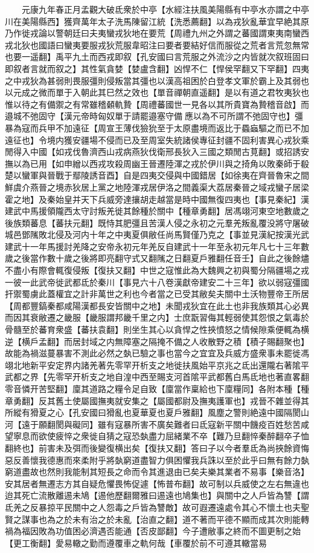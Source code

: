 　　元康九年春正月孟觀大破氐衆於中亭【水經注扶風美陽縣有中亭水亦謂之中亭川在美陽縣西】獲齊萬年太子洗馬陳留江統【洗悉薦翻】以為戎狄亂華宜早絶其原乃作徙戎論以警朝廷曰夫夷蠻戎狄地在要荒【周禮九州之外謂之蕃國謂東夷南蠻西戎北狄也國語曰蠻夷要服戎狄荒服韋昭注曰要者要結好信而服從之荒者言荒忽無常也要一遥翻】禹平九土而西戎即叙【孔安國曰言荒服之外流沙之内皆就次叙班固曰即叙者言就而叙之】其性氣貪婪【婪盧含翻】凶悍不仁【悍侯罕翻又下罕翻】四夷之中戎狄為甚弱則畏服彊則侵叛當其彊也以漢高祖困於白登孝文軍於霸上及其弱也以元成之微而單于入朝此其巳然之效也【單音禪朝直遥翻】是以有道之君牧夷狄也惟以待之有備禦之有常雖稽顙軌贄【周禮蕃國世一見各以其所貴寶為贄稽音啟】而邉城不弛固守【漢元帝時匈奴單于請罷邉塞守備應以為不可所謂不弛固守也】彊暴為寇而兵甲不加遠征【周宣王薄伐獫狁至于太原盡境而返比于蟁蝱驅之而已不加遠征也】令境内獲安疆場不侵而已及至周室失統諸侯專征封疆不固利害異心戎狄乘閒得入中國【如戎伐魯濟西山戎病燕狄伐衛邢長狄入三國之類閒古莧翻】或招誘安撫以為已用【如申繒以西戎攻殺周幽王晉遷陸渾之戎於伊川與之掎角以敗秦師于殽楚以蠻軍與晉戰于鄢陵誘音酉】自是四夷交侵與中國錯居【如徐夷在齊晉魯宋之間鮮虞介燕晉之境赤狄居上黨之地陸渾戎居伊洛之間義渠大荔居秦晉之域戎蠻子居梁霍之地】及秦始皇并天下兵威旁達攘胡走越當是時中國無復四夷也【事見秦紀】漢建武中馬援領隴西太守討叛羌徙其餘種於關中【種章勇翻】居馮翊河東空地數歲之後族類蕃息【蕃扶元翻】既恃其肥彊且苦漢人侵之永初之元羣羌叛亂覆没將守屠破城邑鄧隲敗北侵及河内十年之中夷夏俱敝任尚馬賢僅乃克之【事並見漢紀按漢光武建武十一年馬援討羌降之安帝永初元年羌反自建武十一年至永初元年凡七十三年數歲之後當作數十歲之後將即亮翻守式又翻隲之日翻夏戶雅翻任音壬】自此之後餘燼不盡小有際會輒復侵叛【復扶又翻】中世之寇惟此為大魏興之初與蜀分隔疆場之戎一彼一此武帝徙武都氐於秦川【事見六十八卷漢獻帝建安二十三年】欲以弱寇彊國扞禦蜀虜此蓋權宜之計非萬世之利也今者當之已受其敝矣夫關中土沃物豐帝王所居【周都豐鎬秦都咸陽漢都長安皆關中之地】未聞戎狄宜在此土也非我族類其心必異而因其衰敝遷之畿服【畿服謂邦畿千里之内】士庶翫習侮其輕弱使其怨恨之氣毒於骨髓至於蕃育衆盛【蕃扶袁翻】則坐生其心以貪悍之性挾憤怒之情候隙乘便輒為横逆【横戶孟翻】而居封域之内無障塞之隔掩不備之人收散野之積【積子賜翻聚也】故能為禍滋蔓暴害不測此必然之埶已驗之事也當今之宜宜及兵威方盛衆事未罷徙馮翊北地新平安定界内諸羌著先零罕开析支之地徙扶風始平京兆之氐出還隴右著隂平武都之界【先零罕开析支之地自湟中西至賜支河首隂平武都舊白馬氐地也著直畧翻零音憐开苦堅翻】廩其道路之糧令足自致【廩當作稟給也下廩糧同】各附本種【種章勇翻】反其舊土使屬國撫夷就安集之【屬國都尉及撫夷護軍也】戎晉不雜並得其所縱有猾夏之心【孔安國曰猾亂也夏華夏也夏戶雅翻】風塵之警則絶遠中國隔閡山河【遠于願翻閡與礙同】雖有寇暴所害不廣矣難者曰氐寇新平關中饑疫百姓愁苦咸望寧息而欲使疲悴之衆徙自猜之寇恐埶盡力屈緒業不卒【難乃旦翻悴秦醉翻卒子恤翻終也】前害未及弭而後變復横出矣【復扶又翻】答曰子以今者羣氐為尚挾餘資悔惡反善懷我德惠而來柔附乎將埶窮道盡智力俱困懼我兵誅以至於此乎曰無有餘力埶窮道盡故也然則我能制其短長之命而令其進退由已矣夫樂其業者不易事【樂音洛】安其居者無遷志方其自疑危懼畏怖促遽【怖普布翻】故可制以兵威使之左右無違也迨其死亡流散離逷未鳩【逷他歷翻爾雅曰逷遠也鳩集也】與關中之人戶皆為讐【謂氐羌之反暴掠平民關中之人怨毒之戶皆為讐敵】故可遐遷遠處令其心不懷土也夫聖賢之謀事也為之於未有治之於未亂【治直之翻】道不著而平德不顯而成其次則能轉禍為福因敗為功值困必濟遇否能通【否皮鄙翻】今子遭敝事之終而不圖更制之始【更工衡翻】愛易轍之勤而遵覆車之軌何哉【車覆於前不可遵其轍當易